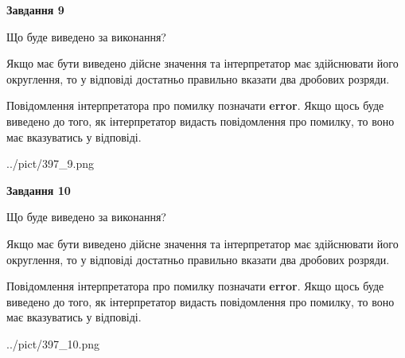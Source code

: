 \documentclass[12pt, ukrainian]{article}
\begin{document}
{\begin {Large}
{\begin {center}\textbf{Завдання 9}\end {center}}\par
Що буде виведено за виконання? \par

Якщо має бути виведено дійсне значення та інтерпретатор має здійснювати його округлення, 
то у відповіді достатньо правильно вказати два дробових розряди.

Повідомлення інтерпретатора про помилку позначати \textbf{error}.
Якщо щось буде виведено до того, як інтерпретатор видасть повідомлення про помилку, 
то воно має вказуватись у відповіді. \par

\begin{center}
	{../pict/397_9.png}
\end{center}
\newpage

{\begin {center}\textbf{Завдання 10}\end {center}}\par
Що буде виведено за виконання? \par

Якщо має бути виведено дійсне значення та інтерпретатор має здійснювати його округлення, 
то у відповіді достатньо правильно вказати два дробових розряди.

Повідомлення інтерпретатора про помилку позначати \textbf{error}.
Якщо щось буде виведено до того, як інтерпретатор видасть повідомлення про помилку, 
то воно має вказуватись у відповіді. \par

\begin{center}
	{../pict/397_10.png}
\end{center}
\newpage

\end {Large}}
\end{document}
